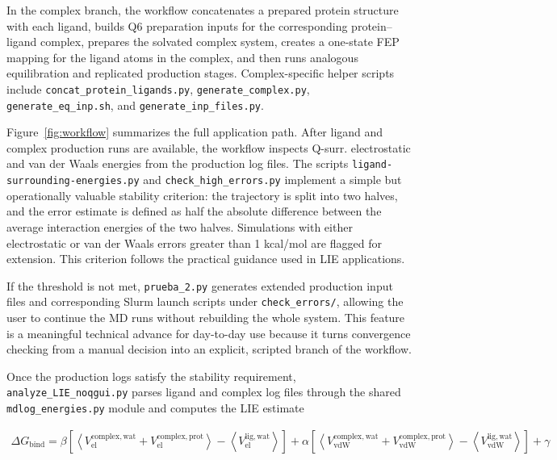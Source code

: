 \documentclass[journal=jcisd8,manuscript=article]{achemso}
\begin{document}
In the complex branch, the workflow concatenates a prepared protein structure with each ligand, builds Q6 preparation inputs for the corresponding protein--ligand complex, prepares the solvated complex system, creates a one-state FEP mapping for the ligand atoms in the complex, and then runs analogous equilibration and replicated production stages. Complex-specific helper scripts include \texttt{concat\_protein\_ligands.py}, \texttt{generate\_complex.py}, \texttt{generate\_eq\_inp.sh}, and \texttt{generate\_inp\_files.py}.

Figure~\ref{fig:workflow} summarizes the full application path. After ligand and complex production runs are available, the workflow inspects Q-surr. electrostatic and van der Waals energies from the production log files. The scripts \texttt{ligand-surrounding-energies.py} and \texttt{check\_high\_errors.py} implement a simple but operationally valuable stability criterion: the trajectory is split into two halves, and the error estimate is defined as half the absolute difference between the average interaction energies of the two halves. Simulations with either electrostatic or van der Waals errors greater than 1 kcal/mol are flagged for extension. This criterion follows the practical guidance used in LIE applications.\cite{gutierrez2012lie}

If the threshold is not met, \texttt{prueba\_2.py} generates extended production input files and corresponding Slurm launch scripts under \texttt{check\_errors/}, allowing the user to continue the MD runs without rebuilding the whole system. This feature is a meaningful technical advance for day-to-day use because it turns convergence checking from a manual decision into an explicit, scripted branch of the workflow.

Once the production logs satisfy the stability requirement, \texttt{analyze\_LIE\_noqgui.py} parses ligand and complex log files through the shared \texttt{mdlog\_energies.py} module and computes the LIE estimate

\begin{multline}
\Delta G_{\mathrm{bind}} =
\beta \left[\left\langle V_{\mathrm{el}}^{\mathrm{complex,wat}} + V_{\mathrm{el}}^{\mathrm{complex,prot}}\right\rangle - \left\langle V_{\mathrm{el}}^{\mathrm{lig,wat}}\right\rangle\right] +
\alpha \left[\left\langle V_{\mathrm{vdW}}^{\mathrm{complex,wat}} + V_{\mathrm{vdW}}^{\mathrm{complex,prot}}\right\rangle - \left\langle V_{\mathrm{vdW}}^{\mathrm{lig,wat}}\right\rangle\right] +
\gamma
\end{multline}
\end{document}
